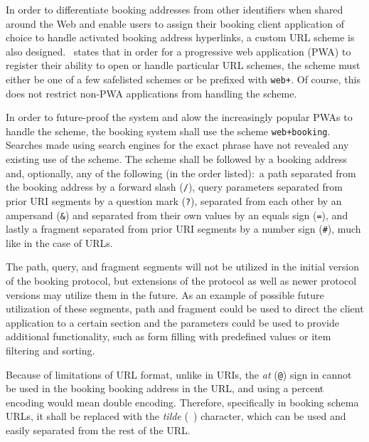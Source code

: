In order to differentiate booking addresses from other identifiers when shared around the Web and enable users to assign their booking client application of choice to handle activated booking address hyperlinks, a custom URL scheme is also designed. \cite{google_pwa_uri}~states that in order for a progressive web application (PWA) to register their ability to open or handle particular URL schemes, the scheme must either be one of a few safelisted schemes or be prefixed with \texttt{web+}. Of course, this does not restrict non-PWA applications from handling the scheme.

\begin{sloppypar}
In order to future-proof the system and alow the increasingly popular PWAs to handle the scheme, the booking system shall use the scheme \texttt{web+booking}. Searches made using search engines for the exact phrase have not revealed any existing use of the scheme. The scheme shall be followed by a booking address and, optionally, any of the following (in the order listed):~a path separated from the booking address by a forward slash (\texttt{/}), query parameters separated from prior URI segments by a question mark (\texttt{?}), separated from each other by an ampersand (\texttt{&}) and separated from their own values by an equals sign (\texttt{=}), and lastly a fragment separated from prior URI segments by a number sign (\texttt{#}), much like in the case of URLs.
\end{sloppypar}

The path, query, and fragment segments will not be utilized in the initial version of the booking protocol, but extensions of the protocol as well as newer protocol versions may utilize them in the future. As an example of possible future utilization of these segments, path and fragment could be used to direct the client application to a certain section and the parameters could be used to provide additional functionality, such as form filling with predefined values or item filtering and sorting.

Because of limitations of URL format, unlike in URIs, the \textit{at} (\texttt{@}) sign in cannot be used in the booking booking address in the URL, and using a percent encoding would mean double encoding. Therefore, specifically in booking schema URLs, it shall be replaced with the \textit{tilde} (\texttt{~}) character, which can be used and easily separated from the rest of the URL.

